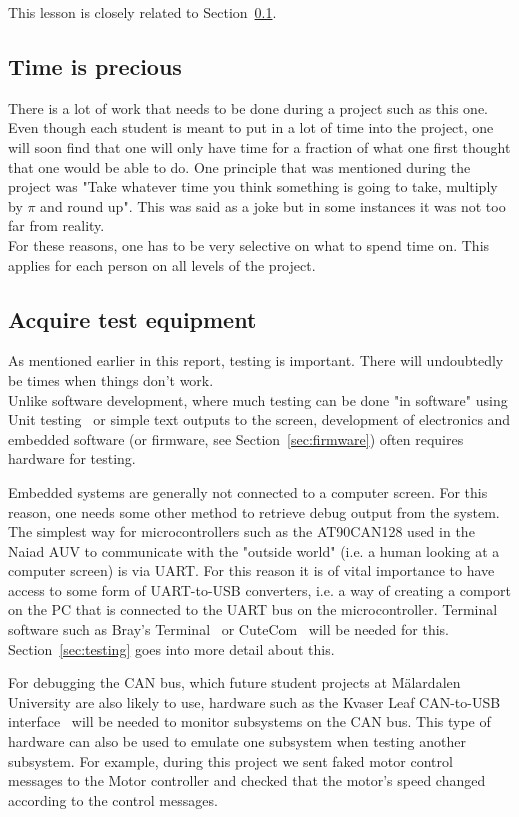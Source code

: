 This lesson is closely related to Section~\ref{sec:time}.

\subsection{Time is precious}\label{sec:time}
There is a lot of work that needs to be done during a project such as this one. Even though each student is meant to put in a lot of time into the project, one will soon find that one will only have time for a fraction of what one first thought that one would be able to do. One principle that was mentioned during the project was "Take whatever time you think something is going to take, multiply by $\pi$ and round up". This was said as a joke but in some instances it was not too far from reality. \\
For these reasons, one has to be very selective on what to spend time on. This applies for each person on all levels of the project.

\subsection{Acquire test equipment}\label{sec:test_equipment}
As mentioned earlier in this report, testing is important. There will undoubtedly be times when things don't work. \\
Unlike software development, where much testing can be done "in software" using Unit testing~\cite{web:wiki_unit_testing} or simple text outputs to the screen, development of electronics and embedded software (or firmware, see Section~\ref{sec:firmware}) often requires hardware for testing.

Embedded systems are generally not connected to a computer screen. For this reason, one needs some other method to retrieve debug output from the system. \\
The simplest way for microcontrollers such as the AT90CAN128 used in the Naiad AUV to communicate with the "outside world" (i.e. a human looking at a computer screen) is via UART. For this reason it is of vital importance to have access to some form of UART-to-USB converters, i.e. a way of creating a comport on the PC that is connected to the UART bus on the microcontroller. Terminal software such as Bray's Terminal~\cite{web:brays_terminal} or  CuteCom~\cite{web:cutecom_terminal} will be needed for this. \\
Section~\ref{sec:testing} goes into more detail about this.

For debugging the CAN bus, which future student projects at M\"{a}lardalen University are also likely to use, hardware such as the Kvaser Leaf CAN-to-USB interface~\cite{web:kvaser_can} will be needed to monitor subsystems on the CAN bus. This type of hardware can also be used to emulate one subsystem when testing another subsystem. For example, during this project we sent faked motor control messages to the Motor controller and checked that the motor's speed changed according to the control messages.

